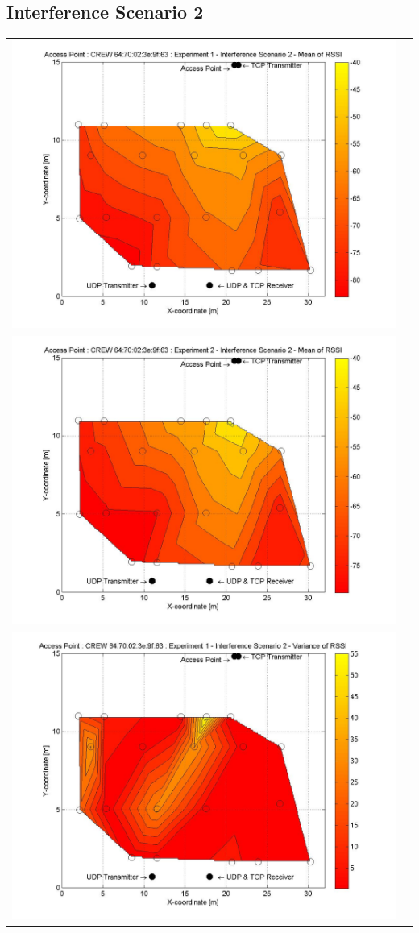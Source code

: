 \documentclass[11pt,a4paper,headinclude,footinclude,chapterprefix=on]{scrreprt}
\begin{document}
\subsection{Interference Scenario 2} 
\begin{longtable}
	{lr} 
	\includegraphics[width=13cm]{../../Source/plot/CREW_63/63_Wifi_Ex_1_Mean.jpg} \\
	\includegraphics[width=13cm]{../../Source/plot/CREW_63/63_Wifi_Ex_2_Mean.jpg} \\
	\includegraphics[width=13cm]{../../Source/plot/CREW_63/63_Wifi_Ex_1_Variance.jpg} \\

\end{longtable}
\end{document}
